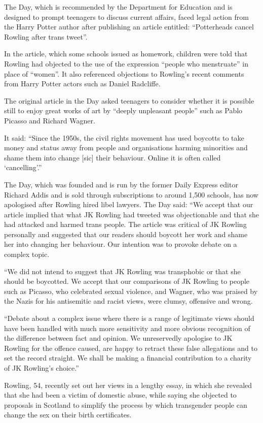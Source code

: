 The Day, which is recommended by the Department for Education and is designed to prompt teenagers to discuss current affairs, faced legal action from the Harry Potter author after publishing an article entitled: “Potterheads cancel Rowling after trans tweet”.

In the article, which some schools issued as homework, children were told that Rowling had objected to the use of the expression “people who menstruate” in place of “women”. It also referenced objections to Rowling’s recent comments from Harry Potter actors such as Daniel Radcliffe.

The original article in the Day asked teenagers to consider whether it is possible still to enjoy great works of art by “deeply unpleasant people” such as Pablo Picasso and Richard Wagner.

It said: “Since the 1950s, the civil rights movement has used boycotts to take money and status away from people and organisations harming minorities and shame them into change [sic] their behaviour. Online it is often called ‘cancelling’.”

The Day, which was founded and is run by the former Daily Express editor Richard Addis and is sold through subscriptions to around 1,500 schools, has now apologised after Rowling hired libel lawyers. The Day said: “We accept that our article implied that what JK Rowling had tweeted was objectionable and that she had attacked and harmed trans people. The article was critical of JK Rowling personally and suggested that our readers should boycott her work and shame her into changing her behaviour. Our intention was to provoke debate on a complex topic.

“We did not intend to suggest that JK Rowling was transphobic or that she should be boycotted. We accept that our comparisons of JK Rowling to people such as Picasso, who celebrated sexual violence, and Wagner, who was praised by the Nazis for his antisemitic and racist views, were clumsy, offensive and wrong.

“Debate about a complex issue where there is a range of legitimate views should have been handled with much more sensitivity and more obvious recognition of the difference between fact and opinion. We unreservedly apologise to JK Rowling for the offence caused, are happy to retract these false allegations and to set the record straight. We shall be making a financial contribution to a charity of JK Rowling’s choice.”

Rowling, 54, recently set out her views in a lengthy essay, in which she revealed that she had been a victim of domestic abuse, while saying she objected to proposals in Scotland to simplify the process by which transgender people can change the sex on their birth certificates.

